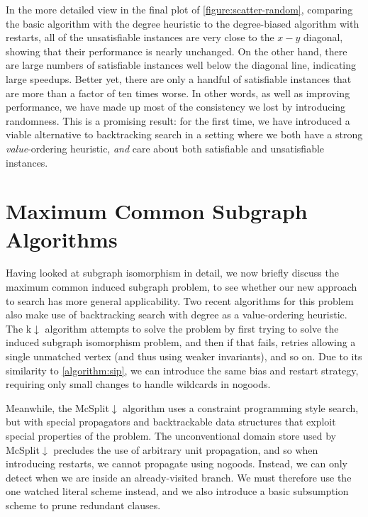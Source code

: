 \documentclass[letterpaper]{article} %
\begin{document}
In the more detailed view in the final plot of \cref{figure:scatter-random}, comparing the
basic algorithm with the degree heuristic to the degree-biased algorithm with restarts, all of the
unsatisfiable instances are very close to the $x-y$ diagonal, showing that their performance is
nearly unchanged. On the other hand, there are large numbers of satisfiable instances well below the
diagonal line, indicating large speedups.  Better yet, there are only a handful of satisfiable
instances that are more than a factor of ten times worse. In other words, as well as improving
performance, we have made up most of the consistency we lost by introducing randomness. This is a
promising result: for the first time, we have introduced a viable alternative to backtracking search
in a setting where we both have a strong \emph{value}-ordering heuristic, \emph{and} care about both
satisfiable and unsatisfiable instances.

\section{Maximum Common Subgraph Algorithms}

Having looked at subgraph isomorphism in detail, we now briefly discuss the maximum common induced
subgraph problem, to see whether our new approach to search has more general applicability.  Two
recent algorithms for this problem also make use of backtracking search with degree as a
value-ordering heuristic. The k${\downarrow}$ algorithm \cite{DBLP:conf/aaai/HoffmannMR17} attempts
to solve the problem by first trying to solve the induced subgraph isomorphism problem, and then if
that fails, retries allowing a single unmatched vertex (and thus using weaker invariants), and so
on. Due to its similarity to \cref{algorithm:sip}, we can introduce the same bias and restart
strategy, requiring only small changes to handle wildcards in nogoods.

Meanwhile, the McSplit${\downarrow}$ algorithm
\cite{DBLP:conf/ijcai/McCreeshPT17} uses a constraint programming style search, but with special
propagators and backtrackable data structures that exploit special properties of the problem. The
unconventional domain store used by McSplit${\downarrow}$ precludes the use of arbitrary unit
propagation, and so when introducing restarts, we cannot propagate using nogoods.  Instead, we can
only detect when we are inside an already-visited branch.  We must therefore use the one watched
literal scheme instead, and we also introduce a basic subsumption scheme to prune redundant clauses.
\end{document}
